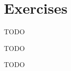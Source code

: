 \section{Exercises}


\begin{exercise}

TODO

\end{exercise}



\begin{exercise}

TODO

\end{exercise}



\begin{exercise}

TODO

\end{exercise}
